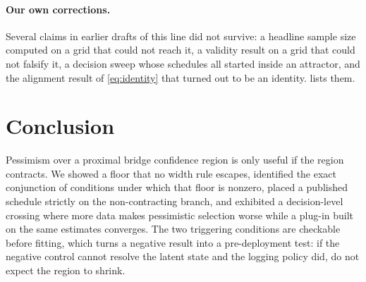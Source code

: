 \documentclass{article}
\theoremstyle{plain}
\theoremstyle{definition}
\begin{document}
\paragraph{Our own corrections.} Several claims in earlier drafts of this line
did not survive: a headline sample size computed on a grid that could not reach
it, a validity result on a grid that could not falsify it, a decision sweep whose
schedules all started inside an attractor, and the alignment result of
\cref{eq:identity} that turned out to be an identity. 
lists them.

\section{Conclusion}

Pessimism over a proximal bridge confidence region is only useful if the region
contracts. We showed a floor that no width rule escapes, identified the exact
conjunction of conditions under which that floor is nonzero, placed a published
schedule strictly on the non-contracting branch, and exhibited a decision-level
crossing where more data makes pessimistic selection worse while a plug-in built
on the same estimates converges. The two triggering conditions are checkable
before fitting, which turns a negative result into a pre-deployment test: if the
negative control cannot resolve the latent state and the logging policy did, do
not expect the region to shrink.




\newpage
\appendix
\onecolumn

\end{document}
